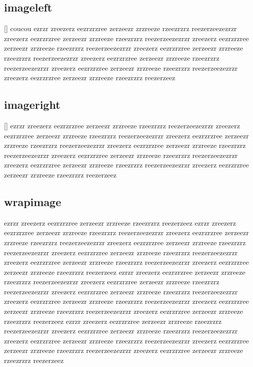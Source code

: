 \documentclass{article}
\begin{document}
\subsection{imageleft}
	[\label{fig:leftimage}]{
		coucou ezrzr zreezerz eezrzrzree zerzeezr zrzreeze rzeezrzrz reezerzeezezrzr zreezerz eezrzrzree zerzeezr zrzreeze rzeezrzrz reezerzeezezrzr zreezerz eezrzrzree zerzeezr zrzreeze rzeezrzrz reezerzeezezrzr zreezerz eezrzrzree zerzeezr zrzreeze rzeezrzrz reezerzeezezrzr zreezerz eezrzrzree zerzeezr zrzreeze rzeezrzrz reezerzeezezrzr zreezerz eezrzrzree zerzeezr zrzreeze rzeezrzrz reezerzeezezrzr zreezerz eezrzrzree zerzeezr zrzreeze rzeezrzrz reezerzeez	
	}
\pagebreak
\subsection{imageright}
	[\label{fig:rightimage}]{
		ezrzr zreezerz eezrzrzree zerzeezr zrzreeze rzeezrzrz reezerzeezezrzr zreezerz eezrzrzree zerzeezr zrzreeze rzeezrzrz reezerzeezezrzr zreezerz eezrzrzree zerzeezr zrzreeze rzeezrzrz reezerzeezezrzr zreezerz eezrzrzree zerzeezr zrzreeze rzeezrzrz reezerzeezezrzr zreezerz eezrzrzree zerzeezr zrzreeze rzeezrzrz reezerzeezezrzr zreezerz eezrzrzree zerzeezr zrzreeze rzeezrzrz reezerzeezezrzr zreezerz eezrzrzree zerzeezr zrzreeze rzeezrzrz reezerzeez	
	}
	
\subsection{wrapimage}
ezrzr zreezerz eezrzrzree zerzeezr zrzreeze rzeezrzrz reezerzeez ezrzr zreezerz eezrzrzree zerzeezr zrzreeze 	rzeezrzrz reezerzeezezrzr zreezerz eezrzrzree zerzeezr zrzreeze rzeezrzrz reezerzeezezrzr zreezerz eezrzrzree zerzeezr zrzreeze rzeezrzrz reezerzeezezrzr zreezerz eezrzrzree zerzeezr zrzreeze rzeezrzrz reezerzeezezrzr zreezerz eezrzrzree zerzeezr zrzreeze rzeezrzrz reezerzeezezrzr zreezerz eezrzrzree zerzeezr zrzreeze rzeezrzrz reezerzeez ezrzr zreezerz eezrzrzree zerzeezr zrzreeze rzeezrzrz reezerzeezezrzr zreezerz eezrzrzree zerzeezr zrzreeze rzeezrzrz reezerzeezezrzr zreezerz eezrzrzree zerzeezr zrzreeze rzeezrzrz reezerzeezezrzr zreezerz eezrzrzree zerzeezr zrzreeze rzeezrzrz reezerzeezezrzr zreezerz eezrzrzree zerzeezr zrzreeze rzeezrzrz reezerzeezezrzr zreezerz eezrzrzree zerzeezr zrzreeze rzeezrzrz reezerzeez ezrzr zreezerz eezrzrzree zerzeezr zrzreeze rzeezrzrz reezerzeezezrzr zreezerz eezrzrzree zerzeezr zrzreeze rzeezrzrz reezerzeezezrzr zreezerz eezrzrzree zerzeezr zrzreeze rzeezrzrz reezerzeezezrzr zreezerz eezrzrzree zerzeezr zrzreeze rzeezrzrz reezerzeezezrzr zreezerz eezrzrzree zerzeezr zrzreeze rzeezrzrz reezerzeez
\end{document}
